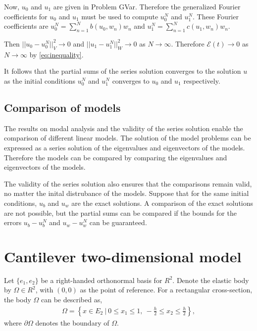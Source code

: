 		Now, $u_0$ and $u_1$ are given in Problem GVar. Therefore the generalized Fourier coefficients for $u_0$ and $u_1$ must be used to compute $u_0^N$ and $u_1^N$. These Fourier coefficients are $\displaystyle u_0^N = \sum_{n=1}^{N} b(u_0, w_n)w_n$ and $\displaystyle u_1^N = \sum_{n=1}^{N} c(u_1, w_n)w_n$.

		Then $||u_0 - u^N_0||_V^2 \rightarrow 0$ and $||u_1 - u^N_1||_W^2 \rightarrow 0$ as $N \rightarrow \infty$. Therefore $\mathcal{E}(t) \rightarrow 0$ as $N \rightarrow \infty$ by \eqref{eq:inequality}.

		It follows that the partial sums of the series solution converges to the solution $u$ as the initial conditions $u_0^N$ and $u_1^N$ converges to $u_0$ and $u_1$ respectively.

	\subsection*{Comparison of models}
		The results on modal analysis and the validity of the series solution enable the comparison of different linear models. The solution of the model problems can be expressed as a series solution of the eigenvalues and eigenvectors of the models. Therefore the models can be compared by comparing the eigenvalues and eigenvectors of the models.

		The validity of the series solution also ensures that the comparisons remain valid, no matter the inital distrubance of the models. Suppose that for the same initial conditions, $u_b$ and $u_w$ are the exact solutions. A comparison of the exact solutions are not possible, but the partial sums can be compared if the bounds for the errors $u_b - u^N_b$ and $u_w - u^N_w$ can be guaranteed.

\section{Cantilever two-dimensional model}\label{ssec:2D_Model:FEM}
Let $\{e_1,e_2\}$ be a right-handed orthonormal basis for $R^2$. Denote the elastic body by $\Omega \in R^2$, with $(0,0)$ as the point of reference. For a rectangular cross-section, the body $\Omega$ can be described as,
\begin{eqnarray*}
	\Omega = \left \{ x \in E_2 \ | \ 0 \leq x_1 \leq 1, \ -\frac{h}{2} \leq x_2 \leq \frac{h}{2} \right \},
\end{eqnarray*} where $\partial \Omega$ denotes the boundary of $\Omega$. 

\FloatBarrier

